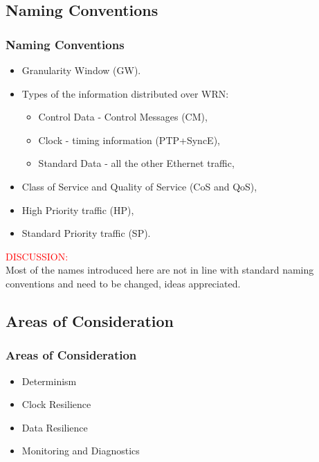 \documentclass[]{beamer}
\begin{document}
\subsection{Naming Conventions}
\begin{frame}
  \frametitle{Naming Conventions}
\centering

\begin{itemize}
  \item Granularity Window (GW).
  \item Types of the information distributed over WRN:
  \begin{itemize}
    \item Control Data - Control Messages (CM),
    \item Clock        - timing information (PTP+SyncE),
    \item Standard Data - all the other Ethernet traffic,
  \end{itemize}
  \item Class of Service and Quality of Service (CoS and QoS),
  \item High Priority traffic (HP),
  \item Standard Priority traffic (SP).
\end{itemize}

\textcolor{red}{DISCUSSION:} \\
Most of the names introduced here are not in line with standard naming
conventions and need to be changed, ideas appreciated.

\end{frame}

\subsection{Areas of Consideration}
\begin{frame}
  \frametitle{Areas of Consideration}


\begin{itemize}
  \item Determinism
  \item Clock Resilience
  \item Data Resilience
  \item Monitoring and Diagnostics
\end{itemize}

\end{frame}
\end{document}
